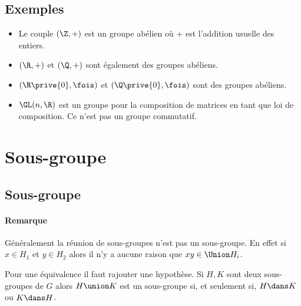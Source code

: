 \documentclass{mybourbaki}
\begin{document}
\subsection{Exemples}

\begin{itemize}
\item Le couple $(\Z,+)$ est un groupe abélien où $+$ est l'addition usuelle des entiers.
\item $(\R,+)$ et $(\Q,+)$ sont également des groupes abéliens.
\item $(\R\prive{0},\fois)$ et $(\Q\prive{0},\fois)$ sont des groupes abéliens.
\item $\GL(n,\R)$ est un groupe pour la composition de matrices en tant que loi de composition. Ce n'est pas un groupe commutatif.
\end{itemize}


\newpage
\section{Sous-groupe}

\subsection{Sous-groupe}


\paragraph{Remarque}Généralement la réunion de sous-groupes n'est pas un sous-groupe. En effet si $x\in H_1$ et $y\in H_2$ alors il n'y a aucune raison que $xy\in \Union H_i$.

Pour une équivalence il faut rajouter une hypothèse. Si $H,K$ sont deux sous-groupes de $G$ alors $H\union K$ est un sous-groupe si, et seulement si, $H\dans K$ ou $K \dans H$.
\end{document}
